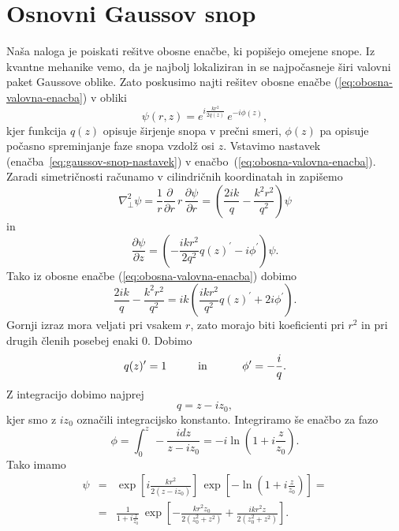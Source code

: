 \section{Osnovni Gaussov snop}
Naša naloga je poiskati rešitve obosne enačbe, ki popišejo omejene
snope. Iz kvantne mehanike vemo, da je najbolj lokaliziran in se najpočasneje
širi valovni paket Gaussove oblike. Zato poskusimo najti rešitev obosne
enačbe (\ref{eq:obosna-valovna-enacba}) v obliki 
\begin{equation}
\psi(r,z)=e^{i\frac{kr^{2}}{2q(z)}}\, e^{-i\phi(z)},\label{eq:gaussov-snop-nastavek}
\end{equation}
kjer funkcija $q(z)$ opisuje širjenje snopa v prečni smeri,
$\phi(z)$ pa opisuje počasno spreminjanje faze snopa vzdolž osi $z$.
Vstavimo nastavek (enačba~\ref{eq:gaussov-snop-nastavek}) v enačbo~(\ref{eq:obosna-valovna-enacba}).
Zaradi simetričnosti računamo v cilindričnih koordinatah in zapišemo
\begin{equation}
\nabla_{\perp}^{2}\psi=\frac{1}{r}\frac{\partial}{\partial r}\, r\,\frac{\partial\psi}{\partial r}=
\left( \frac{2ik}{q}-\frac{k^2r^2}{q^2}\right)\psi
\end{equation}
 in 
\begin{equation}
\frac{\partial\psi}{\partial z}=\left(-\frac{ikr^{2}}{2q^2}q(z)^{\prime}-i\phi^{\prime}\right)\psi.
\end{equation}
Tako iz obosne enačbe (\ref{eq:obosna-valovna-enacba}) dobimo
\begin{equation}
\frac{2ik}{q}-\frac{k^2r^2}{q^2}=ik\left(\frac{ikr^{2}}{q^2}q(z)^{\prime}+2i\phi^{\prime}\right).
\end{equation}
Gornji izraz mora veljati pri vsakem $r$, zato morajo biti koeficienti
pri $r^{2}$ in pri drugih členih posebej enaki 0. Dobimo
\begin{equation}
q(z)^{\prime}=1\mbox{\hskip1cm in \hskip1cm}\phi^{\prime}=-\frac{i}{q}.
\end{equation}
 Z integracijo dobimo najprej 
\begin{equation}
q=z-iz_{0},
\label{eq:alpha}
\end{equation}
kjer smo z $i z_{0}$ označili integracijsko konstanto. 
Integriramo še enačbo za fazo 
\begin{equation}
\phi=\int_{0}^{z}\,-\frac{i dz}{z-iz_{0}}=-i\ln(1+i\frac{z}{z_{0}}).
\end{equation}
Tako imamo 
\begin{eqnarray}
\psi & = & \exp\left[i\frac{kr^{2}}{2(z-iz_0)}\right]\,\exp\left[-\ln(1+i\frac{z}{z_{0}})\right]=
\nonumber \\
 & = & \frac{1}{1+i\frac{z}{z_{0}}}\,\exp\left[-\frac{kr^{2}z_{0}}{2(z_{0}^{2}+z^{2})}+
 \frac{ikr^{2}z}{2(z_{0}^{2}+z^{2})}\right].
 \label{eq:gaussov-snop-vmesni}
\end{eqnarray}
